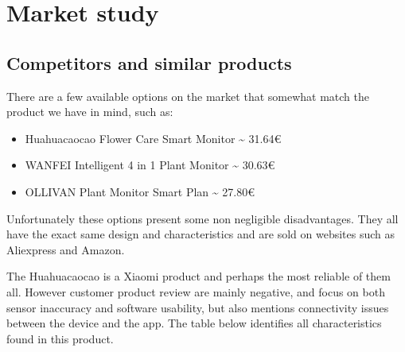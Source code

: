 \section{Market study}

\subsection{Competitors and similar products}
There are a few available options on the market that somewhat match the product
we have in mind, such as:

\begin{itemize}
    \item Huahuacaocao Flower Care Smart Monitor \textasciitilde{} 31.64€
    \item WANFEI Intelligent 4 in 1 Plant Monitor \textasciitilde{} 30.63€
    \item OLLIVAN Plant Monitor Smart Plan \textasciitilde{} 27.80€
\end{itemize}

Unfortunately these options present some non negligible disadvantages. They all
have the exact same design and characteristics and are sold on websites such as
Aliexpress and Amazon. 

The Huahuacaocao is a Xiaomi product and perhaps the most reliable of them all.
However customer product review are mainly negative, and focus on both sensor inaccuracy
and software usability, but also mentions connectivity issues between the device
and the app. The table below identifies all characteristics found in this product. 

